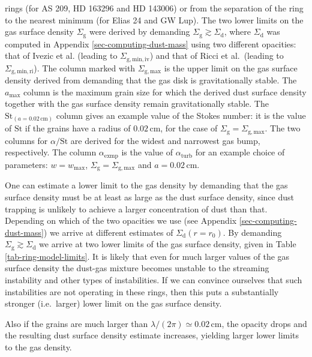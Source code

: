 \documentclass{aa}
\begin{document}
\begin{table*}
{  rings (for AS 209, HD 163296 and HD 143006) or from the separation of the ring
  to the nearest minimum (for Elias 24 and GW Lup). The two lower limits on the
  gas surface density $\Sigma_{\mathrm{g}}$ were derived by demanding
  $\Sigma_{\mathrm{g}}\gtrsim \Sigma_{\mathrm{d}}$, where $\Sigma_{\mathrm{d}}$
  was computed in Appendix \ref{sec-computing-dust-mass} using two different
  opacities: that of Ivezic et al. (leading to $\Sigma_{\mathrm{g,min,iv}}$) and
  that of Ricci et al.\ (leading to $\Sigma_{\mathrm{g,min,ri}}$). The column
  marked with $\Sigma_{\mathrm{g,max}}$ is the upper limit on the gas surface
  density derived from demanding that the gas disk is gravitationally
  stable. The $a_{\mathrm{max}}$ column is the maximum grain size for which the
  derived dust surface density together with the gas surface density remain
  gravitationally stable. The $\mathrm{St}_{(a=0.02\,\mathrm{cm})}$ column gives
  an example value of the Stokes number: it is the value of $\mathrm{St}$ if the
  grains have a radius of $0.02\,\mathrm{cm}$, for the case of
  $\Sigma_{\mathrm{g}}=\Sigma_{\mathrm{g,max}}$. The two columns for
  $\alpha/\mathrm{St}$ are derived for the widest and narrowest
  gas bump, respectively. The column $\alpha_{\mathrm{exmp}}$ is the value of
  $\alpha_{\mathrm{turb}}$ for an example choice of parameters: $w=w_{\mathrm{max}}$,
  $\Sigma_{\mathrm{g}}=\Sigma_{\mathrm{g,max}}$ and $a=0.02\,\mathrm{cm}$.}
\end{table*}

One can estimate a lower limit to the gas density by demanding that the gas
surface density must be at least as large as the dust surface density, since
dust trapping is unlikely to achieve a larger concentration of dust than
that. Depending on which of the two opacities we use (see Appendix
\ref{sec-computing-dust-mass}) we arrive at different estimates of
$\Sigma_{\mathrm{d}}(r=r_0)$. By demanding $\Sigma_{\mathrm{g}}\gtrsim
\Sigma_{\mathrm{d}}$ we arrive at two lower limits of the gas surface density, given in
Table \ref{tab-ring-model-limits}. It is likely that even for much
larger values of the gas surface density the dust-gas mixture becomes
unstable to the streaming instability and other types of instabilities.
If we can convince ourselves that such instabilities are not operating
in these rings, then this puts a substantially stronger (i.e.~larger)
lower limit on the gas surface density.

Also if the grains are much larger than $\lambda/(2\pi)\simeq 0.02\,\mathrm{cm}$,
the opacity drops and the resulting dust surface density estimate increases,
yielding larger lower limits to the gas density.
\end{document}
